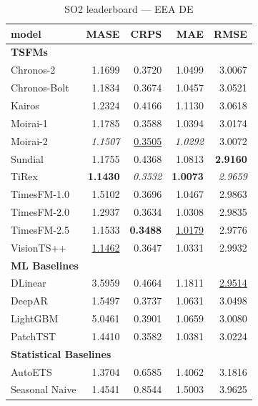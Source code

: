 \begin{table}[H]
\caption{SO2 leaderboard --- EEA DE}
\centering
\begin{small}
\begin{tabular}{lrrrr}
\toprule
model & MASE & CRPS & MAE & RMSE \\
\midrule
\multicolumn{5}{l}{\textbf{TSFMs}} \\
Chronos-2 & 1.1699 & 0.3720 & 1.0499 & 3.0067 \\
Chronos-Bolt & 1.1834 & 0.3674 & 1.0457 & 3.0521 \\
Kairos & 1.2324 & 0.4166 & 1.1130 & 3.0618 \\
Moirai-1 & 1.1785 & 0.3588 & 1.0394 & 3.0174 \\
Moirai-2 & \textit{1.1507} & \underline{0.3505} & \textit{1.0292} & 3.0072 \\
Sundial & 1.1755 & 0.4368 & 1.0813 & \textbf{2.9160} \\
TiRex & \textbf{1.1430} & \textit{0.3532} & \textbf{1.0073} & \textit{2.9659} \\
TimesFM-1.0 & 1.5102 & 0.3696 & 1.0467 & 2.9863 \\
TimesFM-2.0 & 1.2937 & 0.3634 & 1.0308 & 2.9835 \\
TimesFM-2.5 & 1.1533 & \textbf{0.3488} & \underline{1.0179} & 2.9776 \\
VisionTS++ & \underline{1.1462} & 0.3647 & 1.0331 & 2.9932 \\
\midrule
\multicolumn{5}{l}{\textbf{ML Baselines}} \\
DLinear & 3.5959 & 0.4664 & 1.1811 & \underline{2.9514} \\
DeepAR & 1.5497 & 0.3737 & 1.0631 & 3.0498 \\
LightGBM & 5.0461 & 0.3901 & 1.0659 & 3.0080 \\
PatchTST & 1.4410 & 0.3582 & 1.0381 & 3.0224 \\
\midrule
\multicolumn{5}{l}{\textbf{Statistical Baselines}} \\
AutoETS & 1.3704 & 0.6585 & 1.4062 & 3.1816 \\
Seasonal Naive & 1.4541 & 0.8544 & 1.5003 & 3.9625 \\
\bottomrule
\end{tabular}
\end{small}
\end{table}